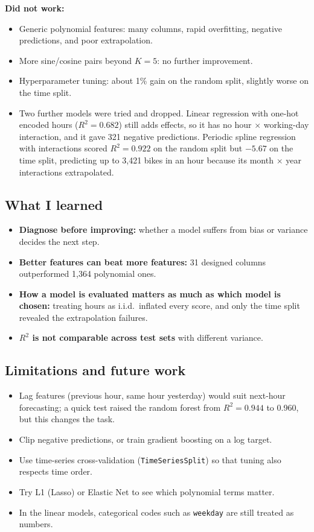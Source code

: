 \documentclass[11pt]{article}
\newcommand{\code}[1]{\texttt{#1}}
\begin{document}
\textbf{Did not work:}
\begin{itemize}
  \item Generic polynomial features: many columns, rapid overfitting, negative predictions, and poor extrapolation.
  \item More sine/cosine pairs beyond $K=5$: no further improvement.
  \item Hyperparameter tuning: about 1\% gain on the random split, slightly worse on the time split.
  \item Two further models were tried and dropped. Linear regression with one-hot encoded hours ($R^2 = 0.682$)
        still adds effects, so it has no hour $\times$ working-day interaction, and it gave 321 negative predictions.
        Periodic spline regression with interactions scored $R^2 = 0.922$ on the random split but $-5.67$ on the
        time split, predicting up to 3,421 bikes in an hour because its month $\times$ year interactions extrapolated.
\end{itemize}

\subsection{What I learned}

\begin{itemize}
  \item \textbf{Diagnose before improving:} whether a model suffers from bias or variance decides the next step.
  \item \textbf{Better features can beat more features:} 31 designed columns outperformed 1,364 polynomial ones.
  \item \textbf{How a model is evaluated matters as much as which model is chosen:} treating hours as i.i.d.\
        inflated every score, and only the time split revealed the extrapolation failures.
  \item \textbf{$R^2$ is not comparable across test sets} with different variance.
\end{itemize}

\subsection{Limitations and future work}

\begin{itemize}
  \item Lag features (previous hour, same hour yesterday) would suit next-hour forecasting; a quick test raised
        the random forest from $R^2 = 0.944$ to 0.960, but this changes the task.
  \item Clip negative predictions, or train gradient boosting on a log target.
  \item Use time-series cross-validation (\code{TimeSeriesSplit}) so that tuning also respects time order.
  \item Try L1 (Lasso) or Elastic Net to see which polynomial terms matter.
  \item In the linear models, categorical codes such as \code{weekday} are still treated as numbers.
\end{itemize}
\end{document}
